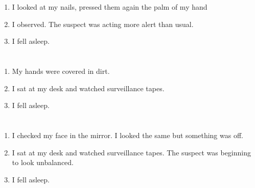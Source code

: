 \documentclass{article}
\begin{document}
    \newpage
    
    \section{}
    
    \begin{enumerate}
    
    \item I looked at my nails, pressed them again the palm of my hand\\
    
    \item I observed. The suspect was acting more alert than usual.\\
    
    \item I fell asleep.\\
    
    \end{enumerate}
     
    \newpage
    
    \section{}
    
    \begin{enumerate}
    
    \item My hands were covered in dirt.\\
    
    \item I sat at my desk and watched surveillance tapes.\\
    
    \item I fell asleep.\\
    
    \end{enumerate}
     
    \newpage
    
    \section{}
    
    \begin{enumerate}
    
    \item I checked my face in the mirror. I looked the same but something was off.\\
    
    \item I sat at my desk and watched surveillance tapes. The suspect was beginning to look unbalanced.\\
    
    \item I fell asleep.\\
    
    \end{enumerate}
     
\end{document}
